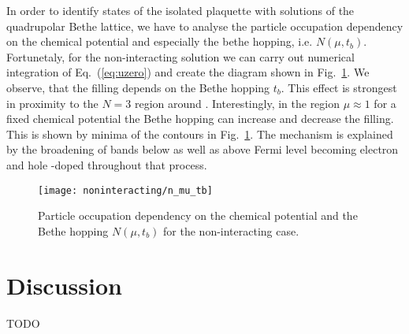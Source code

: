 \documentclass[aps,prb,twocolumn,groupedaddress,amsmath,amssymb]{revtex4-1}
\newcommand{\refeq}[1]{Eq.~(\ref{#1})}
\newcommand{\reffig}[1]{Fig.~\ref{#1}}
\begin{document}
In order to identify states of the isolated plaquette with solutions of the quadrupolar Bethe lattice, we have to analyse the particle occupation dependency on the chemical potential and especially the bethe hopping, i.e. $N(\mu,t_b)$. Fortunetaly, for the non-interacting solution we can carry out numerical integration of \refeq{eq:uzero} and create the diagram shown in \reffig{fig:nonintnmutb}. We observe, that the filling depends on the Bethe hopping $t_b$. This effect is strongest in proximity to the $N=3$ region around . Interestingly, in the region $\mu\approx 1$ for a fixed chemical potential the Bethe hopping can increase and decrease the filling. This is shown by minima of the contours in \reffig{fig:nonintnmutb}. The mechanism is explained by the broadening of bands below as well as above Fermi level becoming electron and hole -doped throughout that process.
\begin{figure}[th]
  \texttt{[image: noninteracting/n\_mu\_tb]}
  \caption{Particle occupation dependency on the chemical potential and the Bethe hopping $N(\mu,t_b)$ for the non-interacting case.}
  \label{fig:nonintnmutb}
\end{figure}

\section{Discussion}
TODO


\end{document}
